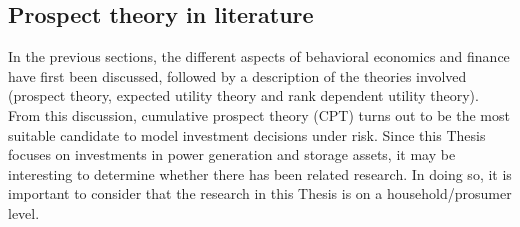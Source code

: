 \subsection{Prospect theory in literature} \label{prospectliterature}
In the previous sections, the different aspects of behavioral economics and finance have first been discussed, followed by a description of the theories involved (prospect theory, expected utility theory and rank dependent utility theory). From this discussion, cumulative prospect theory (CPT) turns out to be the most suitable candidate to model investment decisions under risk. Since this Thesis focuses on investments in power generation and storage assets, it may be interesting to determine whether there has been related research. In doing so, it is important to consider that the research in this Thesis is on a household/prosumer level.  
